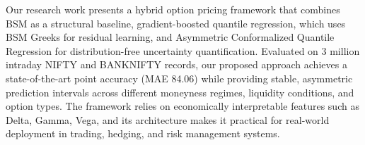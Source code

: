 \documentclass[runningheads]{llncs}
\newcommand{\rev}[1]{{\color{blue}#1}}
\begin{document}
\rev{Our research work presents a hybrid option pricing framework that combines BSM as a structural baseline, gradient-boosted quantile regression, which uses BSM Greeks for residual learning, and Asymmetric Conformalized Quantile Regression for distribution-free uncertainty quantification. Evaluated on 3 million intraday NIFTY and BANKNIFTY records, our proposed approach achieves a state-of-the-art point accuracy (MAE 84.06) while providing stable, asymmetric prediction intervals across different moneyness regimes, liquidity conditions, and option types. The framework relies on economically interpretable features such as Delta, Gamma, Vega, and its architecture makes it practical for real-world deployment in trading, hedging, and risk management systems.}




\end{document}
